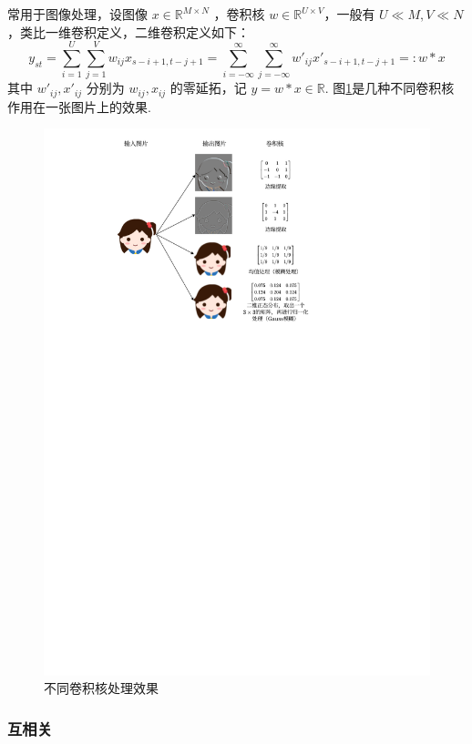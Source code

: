 \documentclass[12pt, a4paper, oneside]{ctexart}
\numberwithin{equation}{section}  %
\begin{document}
常用于图像处理，设图像 \(x\in\mathbb{R}^{M\times N}\) ，卷积核
\(w\in\mathbb{R}^{U\times V}\)，一般有
\(U\ll M,V\ll N\)，类比一维卷积定义，二维卷积定义如下：
\begin{equation}\label{eq-2Dconv}
   y_{st} = \sum_{i=1}^U\sum_{j=1}^Vw_{ij}x_{s-i+1,t-j+1}=\sum_{i=-\infty}^\infty\sum_{j=-\infty}^\infty w'_{ij}x'_{s-i+1,t-j+1}=:w*x 
\end{equation}
其中 \(w'_{ij}, x'_{ij}\) 分别为 \(w_{ij}, x_{ij}\) 的零延拓，记
\(y=w * x\in\mathbb{R}\). 图\ref{fig-diff-kernel}是几种不同卷积核作用在一张图片上的效果.
\begin{figure}[htbp]
    \centering
    \includegraphics[scale=0.8]{differnt kernel.drawio.pdf}
    \caption{不同卷积核处理效果}
    \label{fig-diff-kernel}
\end{figure}

\subsubsection{互相关}
\end{document}
